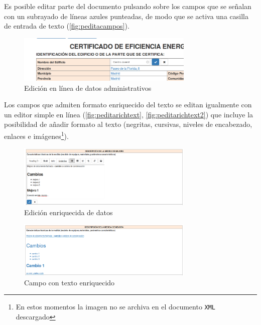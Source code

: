 \documentclass[10pt,notitlepage,oneside,a4paper]{article}
\begin{document}
Es posible editar parte del documento pulsando sobre los campos que se señalan con un subrayado de líneas azules punteadas, de modo que se activa una casilla de entrada de texto (\autoref{fig:peditacampos}).

\begin{figure}[H]
  \centering
  \includegraphics[width=0.75\textwidth]{imagenes/pantalla_editacampos}  
  \caption{Edición en línea de datos administrativos}
  \label{fig:peditacampos}
\end{figure}

Los campos que admiten formato enriquecido del texto se editan igualmente con un editor simple en línea (\autoref{fig:peditarichtext}, \autoref{fig:peditarichtext2}) que incluye la posibilidad de añadir formato al texto (negritas, cursivas, niveles de encabezado, enlaces e imágenes\footnote{En estos momentos la imagen no se archiva en el documento \texttt{XML} descargado}).

\begin{figure}[H]
  \centering
  \includegraphics[width=0.75\textwidth]{imagenes/peditarichtext}  
  \caption{Edición enriquecida de datos}
  \label{fig:peditarichtext}
\end{figure}

\begin{figure}[H]
  \centering
  \includegraphics[width=0.75\textwidth]{imagenes/peditarichtext2}  
  \caption{Campo con texto enriquecido}
  \label{fig:peditarichtext2}
\end{figure}
\end{document}

